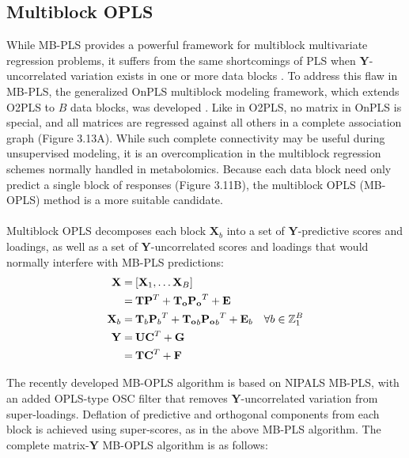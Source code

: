 \subsection{Multiblock OPLS}

\begin{doublespace}
While MB-PLS provides a powerful framework for multiblock multivariate
regression problems, it suffers from the same shortcomings of PLS when
$\mathbf{Y}$-uncorrelated variation exists in one or more data blocks
\cite{lofstedt:jchemo2011,lofstedt2012}. To address this flaw in MB-PLS,
the generalized OnPLS multiblock modeling framework, which extends O2PLS to
$B$ data blocks, was developed \cite{lofstedt2012}. Like in O2PLS, no matrix
in OnPLS is special, and all matrices are regressed against all others in a
complete association graph (Figure 3.13A). While such complete connectivity
may be useful during unsupervised modeling, it is an overcomplication in
the multiblock regression schemes normally handled in metabolomics. Because
each data block need only predict a single block of responses (Figure 3.11B),
the multiblock OPLS (MB-OPLS) method is a more suitable candidate.
\\\\
Multiblock OPLS decomposes each block $\mathbf{X}_b$ into a set of
$\mathbf{Y}$-predictive scores and loadings, as well as a set of
$\mathbf{Y}$-uncorrelated scores and loadings that would normally
interfere with MB-PLS predictions:
\begin{align}
\mathbf{X} =& \: [\mathbf{X}_1, \dots \mathbf{X}_B] \\
           =& \: \mathbf{T} \mathbf{P}^T +
                 \mathbf{T_o} \mathbf{P_o}^T + \mathbf{E} \\
\mathbf{X}_b =& \: \mathbf{T}_b {\mathbf{P}_b}^T +
                   \mathbf{T_o}_b {\mathbf{P_o}_b}^T + \mathbf{E}_b
 \quad \forall b \in \mathbb{Z}_{1}^{B} \\
\mathbf{Y} =& \: \mathbf{U} \mathbf{C}^T + \mathbf{G} \\
           =& \: \mathbf{T} \mathbf{C}^T + \mathbf{F} \nonumber
\end{align}

The recently developed MB-OPLS algorithm is based on NIPALS MB-PLS, with an
added OPLS-type OSC filter that removes $\mathbf{Y}$-uncorrelated variation
from super-loadings. Deflation of predictive and orthogonal components from
each block is achieved using super-scores, as in the above MB-PLS algorithm.
The complete matrix-$\mathbf{Y}$ MB-OPLS algorithm is as follows:
\end{doublespace}

